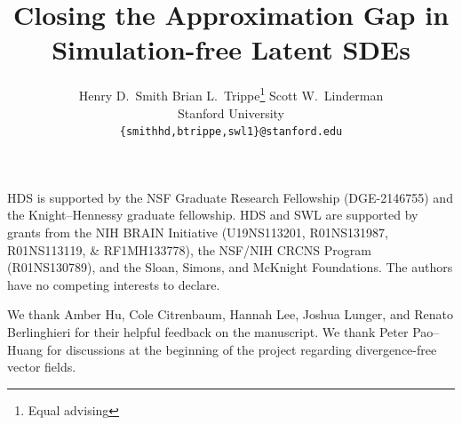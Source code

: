 \documentclass{article}
\title{Closing the Approximation Gap in Simulation-free Latent SDEs}
\author{
\begin{tabular}{c}
Henry D.~Smith
\qquad Brian L.~Trippe\thanks{Equal advising}
\qquad Scott W.~Linderman\footnotemark[1] \\
{\normalfont Stanford University} \\
\texttt{\{smithhd,btrippe,swl1\}@stanford.edu}
\end{tabular}
}
\begin{document}
\maketitle









\begin{ack}
HDS is supported by the NSF Graduate Research Fellowship (DGE-2146755) and the Knight--Hennessy graduate fellowship. 
HDS and SWL are supported by grants from the NIH BRAIN Initiative (U19NS113201, R01NS131987, R01NS113119, \& RF1MH133778), the NSF/NIH CRCNS Program (R01NS130789), and the Sloan, Simons, and McKnight Foundations.
The authors have no competing interests to declare.


We thank Amber Hu, Cole Citrenbaum, Hannah Lee, Joshua Lunger, and Renato Berlinghieri for their helpful feedback on the manuscript. 
We thank Peter Pao--Huang for discussions at the beginning of the project regarding divergence-free vector fields. 
\end{ack}



\end{document}
